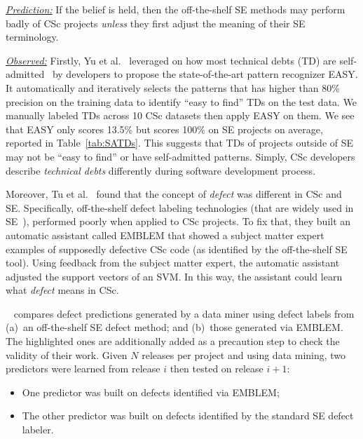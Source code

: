 \documentclass[conference,10pt]{IEEEtran}
\newcommand{\bi}{\begin{itemize}}
\newcommand{\ei}{\end{itemize}}
\begin{document}
\newcommand{\varendash}[1][5pt]{%
  \makebox[#1]{\leaders\hbox{--}\hfill\kern0pt}%
}





\noindent \textit{\underline{Prediction:}} If the belief is held, then the off-the-shelf SE methods may perform badly of CSc projects {\em unless} they first adjust the meaning of their SE terminology.

\noindent \textit{\underline{Observed:}} Firstly, Yu et al.~\cite{jitterbug} leveraged on how most technical debts (TD) are self-admitted~\cite{potdar2014exploratory} by developers to propose the state-of-the-art pattern recognizer EASY.  It automatically and iteratively selects the patterns that has higher than 80\% precision on the training data to identify ``easy to find'' TDs on the test data. We manually labeled TDs across 10 CSc datasets then  apply EASY on them. We see that EASY only scores 13.5\% but scores 100\% on SE projects on average, reported in Table~\ref{tab:SATDs}. This suggests that TDs of projects outside of SE may not be ``easy to find'' or have self-admitted patterns. Simply, CSc developers describe {\em technical debts} differently during software development process. 


Moreover, Tu et al.~\cite{tu2019better} found that the concept of {\em defect} was  different in CSc and SE.
Specifically, off-the-shelf defect labeling technologies (that are widely used  in SE~\cite{tu2019better,mockus00changeskeys,kamei12_jit, hindle08_largecommits, Kim08changes}),
performed poorly when applied to CSc projects.
To fix that, they built an automatic assistant called EMBLEM that showed a subject matter expert 
examples of supposedly defective CSc code (as identified by the off-the-shelf SE tool).
Using feedback from the subject matter expert, the automatic assistant adjusted the support vectors of an SVM. In this way, the assistant could learn what {\em defect} means in CSc.

~ 
compares defect predictions generated by a data
miner using defect labels from (a)~an off-the-shelf SE defect method;
and (b)~those generated via EMBLEM. The \colorbox{gray!30}{highlighted} ones are additionally added as a precaution step to check the validity of their work. 
Given $N$ releases per project and using data mining, two predictors were learned from release $i$ then tested on release $i+1$:
\bi
\item
One predictor was built on defects identified  via EMBLEM;
\item
The other predictor was built on defects identified by the standard SE defect labeler.
\ei
\end{document}
